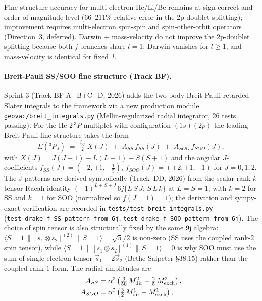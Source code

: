 \documentclass[aps,pra,twocolumn,superscriptaddress,longbibliography]{revtex4-2}
\begin{document}
Fine-structure accuracy for multi-electron He/Li/Be remains at
sign-correct and order-of-magnitude level (66--211\% relative error
in the 2p-doublet splitting); improvement requires multi-electron
spin-spin and spin-other-orbit operators (Direction~3, deferred).
Darwin + mass-velocity do not improve the 2p-doublet splitting
because both $j$-branches share $l = 1$: Darwin vanishes for $l \geq 1$,
and mass-velocity is identical for fixed~$l$.

\paragraph{Breit-Pauli SS/SOO fine structure (Track BF).}
Sprint 3 (Track BF-A+B+C+D, 2026) adds the two-body Breit-Pauli
retarded Slater integrals to the framework via a new production
module \texttt{geovac/breit\_integrals.py} (Mellin-regularized
radial integrator, 26 tests passing).  For the He $2\,^3\!P$
multiplet with configuration $(1s)(2p)$ the leading Breit-Pauli
fine structure takes the form
\begin{equation}\label{eq:breit_pauli_3P}
  E(^3P_J) \;=\; \tfrac{\zeta_{2p}}{2}\,X(J) \;+\; A_{SS}\,f_{SS}(J) \;+\; A_{SOO}\,f_{SOO}(J),
\end{equation}
with $X(J) = J(J+1) - L(L+1) - S(S+1)$ and the angular
$J$-coefficients
$f_{SS}(J) = (-2, +1, -\tfrac{1}{5})$, $f_{SOO}(J) = (+2, +1, -1)$
for $J = 0, 1, 2$.  The J-patterns are derived symbolically
(Track~DD, 2026) from the scalar rank-$k$ tensor Racah identity
$(-1)^{L+S+J}\,6j\{L\,S\,J;\,S\,L\,k\}$ at $L = S = 1$, with
$k = 2$ for SS and $k = 1$ for SOO (normalized so $f(J=1) = 1$);
the derivation and sympy-exact verification are recorded in
\texttt{tests/test\_breit\_integrals.py}
(\texttt{test\_drake\_f\_SS\_pattern\_from\_6j},
\texttt{test\_drake\_f\_SOO\_pattern\_from\_6j}).  The choice of
spin tensor is also structurally fixed by the same 9j algebra:
$\langle S{=}1\,\|[s_1\!\otimes\!s_2]^{(2)}\|\,S{=}1\rangle = \sqrt{5}/2$
is non-zero (SS uses the coupled rank-$2$ spin tensor), while
$\langle S{=}1\,\|[s_1\!\otimes\!s_2]^{(1)}\|\,S{=}1\rangle = 0$
is why SOO must use the sum-of-single-electron tensor
$\vec s_1 + 2\vec s_2$ (Bethe-Salpeter \S38.15) rather than the
coupled rank-$1$ form.  The radial amplitudes are
\begin{align}\label{eq:drake_amplitudes}
  A_{SS}  &= \alpha^2 \left( \tfrac{3}{50}\, M^2_{\rm dir} - \tfrac{2}{5}\, M^2_{\rm exch} \right), \\
  A_{SOO} &= \alpha^2 \left( \tfrac{3}{2}\, M^1_{\rm dir} - M^1_{\rm exch} \right),\nonumber
\end{align}
\end{document}
